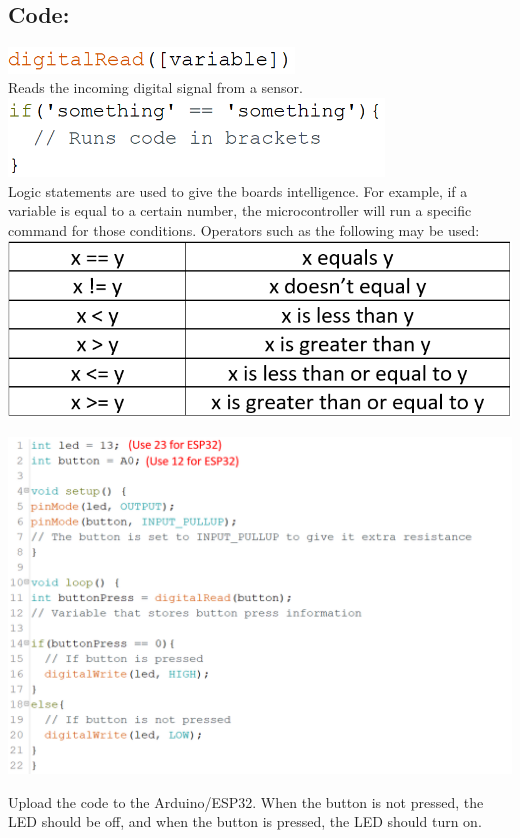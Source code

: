 \documentclass[a4paper,12pt]{report}
\newcommand{\diagramWidth}{150mm}
\newcommand{\codeHeight}{7mm}
\begin{document}
\subsection*{Code:}
    \begin{mdframed}[linewidth = 3, linecolor = turbo_purple]
        \includegraphics[height = \codeHeight]{Assets/dread.png} \\
        Reads the incoming digital signal from a sensor. \\
        \includegraphics[height = 21mm]{Assets/if.png} \\
        Logic statements are used to give the boards intelligence. For example, if a variable is equal to a certain number, the microcontroller will run a specific command for those conditions. Operators such as the following may be used: \\
        \includegraphics[scale = 0.4]{Assets/operators.png}
    \end{mdframed}
    \newpage
    \begin{center}
        \includegraphics[width = \diagramWidth]{Assets/led_button.png}\\
    \end{center}
    Upload the code to the Arduino/ESP32. When the button is not pressed, the LED should be off, and when the button is pressed, the LED should turn on.
\end{document}
